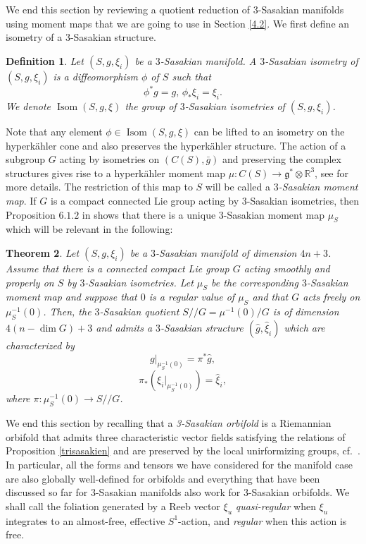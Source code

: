 \documentclass[12pt, reqno]{amsart}
\newtheorem{Def}{Definition}[subsection]
\newtheorem{theo}[Def]{Theorem}
\theoremstyle{definition}
\DeclareMathOperator\Isom{Isom}
\newcommand{\R}{\mathbb{R}}
\newcommand{\g}{\mathfrak{g}}
\begin{document}
\indent We end this section by reviewing a quotient reduction of $3$-Sasakian manifolds using moment maps that we are going to use in Section \ref{4.2}. We first define an isometry of a $3$-Sasakian structure.
\begin{Def}
    Let $(S,g,\xi_i)$ be a $3$-Sasakian manifold. A $3$-Sasakian isometry of $(S,g,\xi_i)$ is a diffeomorphism $\phi$ of $S$ such that $$\phi^*g=g,\, \phi_*\xi_i=\xi_i.$$ We denote $\Isom(S,g,\xi)$ the group of $3$-Sasakian isometries of $(S,g,\xi_i)$. 
\end{Def}
Note that any element $\phi\in\Isom(S,g,\xi)$ can be lifted to an isometry on the hyperkähler cone and also preserves the hyperkähler structure. The action of a subgroup $G$ acting by isometries on $(C(S),\bar g)$ and preserving the complex structures gives rise to a hyperkähler moment map $\mu : C(S)\to\g^*\otimes\R^3$, see \cite{Hyperkahlermetricssupersymmetry} for more details. The restriction of this map to $S$ will be called a \textit{$3$-Sasakian moment map}. If $G$ is a compact connected Lie group acting by $3$-Sasakian isometries, then Proposition $6.1.2$ in \cite{Boyer:1998sf} shows that there is a unique $3$-Sasakian moment map $\mu_S$ which will be relevant in the following:
\begin{theo}\label{reductiontheorem}\cite[Theorem 6.1.5]{Boyer:1998sf} Let $(S,g,\xi_i)$ be a $3$-Sasakian manifold of dimension $4n+3$. Assume that there is a connected compact Lie group $G$ acting smoothly and properly on $S$ by $3$-Sasakian isometries. Let $\mu_S$ be the corresponding $3$-Sasakian moment map and suppose that $0$ is a regular value of $\mu_S$ and that $G$ acts freely on $\mu_S^{-1}(0)$. Then, the $3$-Sasakian quotient $S/\!\!/G=\mu^{-1}(0)/G$ is of dimension $4(n-\dim G)+3$ and admits a $3$-Sasakian structure $(\hat g,\hat\xi_i)$ which are characterized by
$$g|_{\mu^{-1}_S(0)}=\pi^*\hat g,$$ $$\pi_*(\xi_i|_{\mu^{-1}_S(0)})=\hat\xi_i,$$ where $\pi : \mu^{-1}_S(0)\to S/\!\!/G $. 
\end{theo}
We end this section by recalling that a \textit{3-Sasakian orbifold} is a Riemannian orbifold that admits three characteristic vector fields satisfying the relations of Proposition \ref{trisasakien} and are preserved by the local unirformizing groups, cf.~\cite[Remark 1.2.3]{Boyer:1998sf}. In particular, all the forms and tensors we have considered for the manifold case are also globally well-defined for orbifolds and everything that have been discussed so far for $3$-Sasakian manifolds also work for $3$-Sasakian orbifolds. 
We shall call the foliation generated by a Reeb vector  $\xi_u$ \textit{quasi-regular} when $\xi_u$ integrates to an almost-free, effective $S^1$-action, and \textit{regular} when this action is free.
\end{document}
